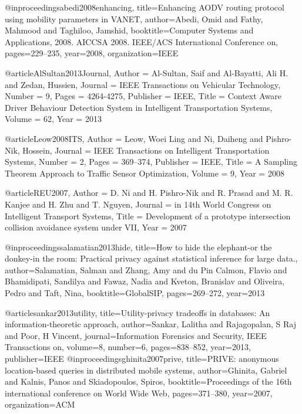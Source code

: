 {{{{@inproceedings{abedi2008enhancing,
	title={Enhancing AODV routing protocol using mobility parameters in VANET},
	author={Abedi, Omid and Fathy, Mahmood and Taghiloo, Jamshid},
	booktitle={Computer Systems and Applications, 2008. AICCSA 2008. IEEE/ACS International Conference on},
	pages={229--235},
	year={2008},
	organization={IEEE}
}


@article{AlSultan2013Journal,
	Author = {Al-Sultan, Saif and Al-Bayatti, Ali H. and Zedan, Hussien},
	Journal = {IEEE Transactions on Vehicular Technology},
	Number = {9},
	Pages = {4264-4275},
	Publisher = {IEEE},
	Title = {Context Aware Driver Behaviour Detection System in Intelligent Transportation Systems},
	Volume = {62},
	Year = {2013}}






@article{Leow2008ITS,
	Author = {Leow, Woei Ling and Ni, Daiheng and Pishro-Nik, Hossein},
	Journal = {IEEE Transactions on Intelligent Transportation Systems},
	Number = {2},
	Pages = {369--374},
	Publisher = {IEEE},
	Title = {A Sampling Theorem Approach to Traffic Sensor Optimization},
	Volume = {9},
	Year = {2008}}



@article{REU2007,
	Author = {D. Ni and H. Pishro-Nik and R. Prasad and M. R. Kanjee and H. Zhu and T. Nguyen},
	Journal = {in 14th World Congress on Intelligent Transport Systems},
	Title = {Development of a prototype intersection collision avoidance system under VII},
	Year = {2007}}




@inproceedings{salamatian2013hide,
	title={How to hide the elephant-or the donkey-in the room: Practical privacy against statistical inference for large data.},
	author={Salamatian, Salman and Zhang, Amy and du Pin Calmon, Flavio and Bhamidipati, Sandilya and Fawaz, Nadia and Kveton, Branislav and Oliveira, Pedro and Taft, Nina},
	booktitle={GlobalSIP},
	pages={269--272},
	year={2013}
}

@article{sankar2013utility,
	title={Utility-privacy tradeoffs in databases: An information-theoretic approach},
	author={Sankar, Lalitha and Rajagopalan, S Raj and Poor, H Vincent},
	journal={Information Forensics and Security, IEEE Transactions on},
	volume={8},
	number={6},
	pages={838--852},
	year={2013},
	publisher={IEEE}
}
@inproceedings{ghinita2007prive,
	title={PRIVE: anonymous location-based queries in distributed mobile systems},
	author={Ghinita, Gabriel and Kalnis, Panos and Skiadopoulos, Spiros},
	booktitle={Proceedings of the 16th international conference on World Wide Web},
	pages={371--380},
	year={2007},
	organization={ACM}
}

}}}}
